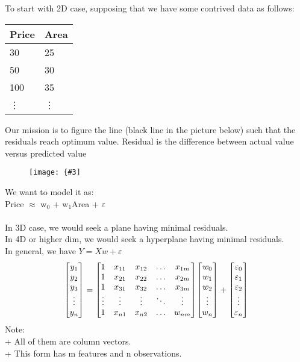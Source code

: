 \documentclass[12pt,a4paper]{article}
\newcommand{\img}[3]{
	\texttt{[image: \{\#3]}}}
\newcommand{\subscript}[1]{_{{#1}}}
\begin{document}
\noindent To start with 2D case, supposing that we have some contrived data as follows:
\begin{center}
\begin{table}[h!]
	\begin{tabular}{l|l}
		Price 				 & Area\\ \hline
		30    				 & 25 \\
		50    				 & 30 \\
		100   				 & 35 \\
		\hspace{3mm}\vdots   & \hspace{.5mm} \vdots \\
	\end{tabular}
\end{table}
\end{center}
Our mission is to figure the line (black line in the picture below) such that the residuals reach optimum value. Residual is the difference between actual value versus predicted value\\
\begin{figure}[h!]
\img{5cm}{3cm}{Picture/Linear_regression/1.png}
\end{figure}

\noindent We want to model it as:\\
Price $\approx$ w$\subscript{0}$ + w$\subscript{1}$Area + $\varepsilon$\\\\
In 3D case, we would seek a plane having minimal residuals.\\
In 4D or higher dim, we would seek a hyperplane having minimal residuals.\\

\noindent In general, we have $Y = Xw + \varepsilon$\\
\begin{displaymath}
\mqty[y_1\\ y_2\\ y_3\\ \vdots\\ y_n] =
\mqty[1& x\subscript{11}& x\subscript{12}& \hdots& x\subscript{1m}\\
1& x\subscript{21}& x\subscript{22}& \hdots& x\subscript{2m}\\
1& x\subscript{31}& x\subscript{32}& \hdots& x\subscript{3m}\\
\vdots& \vdots &\vdots &\ddots &\vdots\\
1& x\subscript{n1}& x\subscript{n2}& \hdots& w\subscript{nm}]
\mqty[w_0\\ w_1\\ w_2\\ \vdots\\ w_n] +
\mqty[\varepsilon_0\\ \varepsilon_1\\ \varepsilon_2\\ \vdots\\ \varepsilon_n]
\end{displaymath}
Note:\\
+ All of them are column vectors.\\
+ This form has m features and n observations.\\
\end{document}
